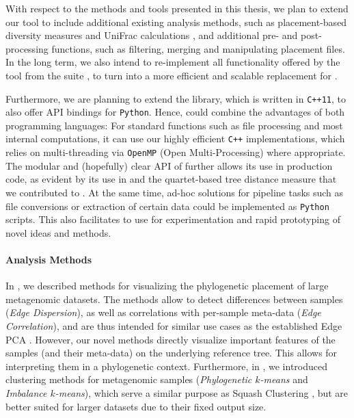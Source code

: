 
With respect to the methods and tools presented in this thesis,
we plan to extend our  tool to include additional existing analysis methods,
such as placement-based diversity measures \cite{Matsen2010} and UniFrac calculations \cite{Lozupone2005},
and additional pre- and post-processing functions, such as filtering, merging and manipulating placement files.
In the long term, we also intend to re-implement all functionality offered by the
 tool from the  suite \cite{Matsen2010},
to turn  into a more efficient and scalable replacement for .

Furthermore, we are planning to extend the  library, which is written in \texttt{C++11},
to also offer \acs{API} bindings for \texttt{Python}.
Hence,  could combine the advantages of both programming languages:
For standard functions such as file processing and most internal computations,
it can use our highly efficient \texttt{C++} implementations,
which relies on multi-threading via \texttt{OpenMP} (Open Multi-Processing) where appropriate.
The modular and (hopefully) clear \acs{API} of  further allows its use in production code,
as evident by its use in  and the quartet-based tree distance measure that we contributed to \cite{Zhou2017}.
At the same time, ad-hoc solutions for pipeline tasks such as file conversions or extraction of certain data
could be implemented as \texttt{Python} scripts.
This also facilitates to use  for experimentation and rapid prototyping of novel ideas and methods.

\paragraph{Analysis Methods}
\label{ch:ConclusionOutlook:par:AnalysisMethods}


In , we described methods for visualizing the phylogenetic placement of large metagenomic datasets.
The methods allow to detect differences between samples (\emph{Edge Dispersion}),
as well as correlations with per-sample meta-data (\emph{Edge Correlation}),
and are thus intended for similar use cases as the established Edge PCA \citep{Matsen2011a}.
However, our novel methods directly visualize important features of the samples (and their meta-data)
on the underlying reference tree.
This allows for interpreting them in a phylogenetic context.
Furthermore, in , we introduced clustering methods for metagenomic samples
(\emph{Phylogenetic $k$-means} and \emph{Imbalance $k$-means}),
which serve a similar purpose as Squash Clustering \citep{Matsen2011a},
but are better suited for larger datasets due to their fixed output size.


